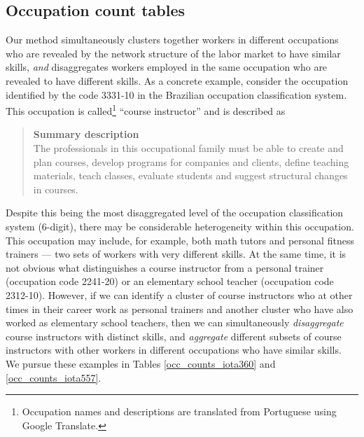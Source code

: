 \documentclass[12pt]{article}
\theoremstyle{definition}
\theoremstyle{plain}
\begin{document}

\subsection{Occupation count tables}
\label{sec:occ_count_tables}

Our method simultaneously clusters together workers in different occupations who are revealed by the network structure of the labor market to have similar skills, \emph{and} disaggregates workers employed in the same occupation who are revealed to have different skills. As a concrete example, consider the occupation identified by the code 3331-10 in the Brazilian occupation classification system. This occupation is called\footnote{Occupation names and descriptions are translated from Portuguese using Google Translate.} ``course instructor'' and is described as 
\begin{quote}
	\textbf{Summary description}\\
	The professionals in this occupational family must be able to create and plan courses, develop programs for companies and clients, define teaching materials, teach classes, evaluate students and suggest structural changes in courses.
\end{quote}
Despite this being the most disaggregated level of the occupation classification system (6-digit), there may be considerable heterogeneity within this occupation. This occupation may include, for example, both math tutors and personal fitness trainers --- two sets of workers with very different skills. At the same time, it is not obvious what distinguishes a  course instructor from a personal trainer (occupation code 2241-20) or an elementary school teacher (occupation code 2312-10). However, if we can identify a cluster of course instructors who at other times in their career work as personal trainers and another cluster who have also worked as elementary school teachers, then we can simultaneously \emph{disaggregate} course instructors with distinct skills, and  \emph{aggregate} different subsets of course instructors with other workers in different occupations who have similar skills.  We pursue these examples in Tables \ref{occ_counts_iota360} and \ref{occ_counts_iota557}. 
\end{document}
